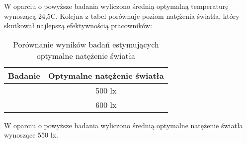 W oparciu o powyższe badania wyliczono średnią optymalną temperaturę wynoszącą 24,5\degree C.
Kolejna z tabel porównuje poziom natężenia światła, który skutkował najlepszą 
efektywnością pracowników:

\begin{table}[ht]
    \centering
    \caption{Porównanie wyników badań estymujących optymalne natężenie światła}
    \begin{tabular}{ |c|c| } 
     \hline
     Badanie & Optymalne natężenie światła \\ 
     \hline
     \parencite{chinchiuan2014} & 500 lx \\ 
     \hline
     \parencite{liu2017} & 600 lx \\ 
     \hline
    \end{tabular}
    \label{tab:optymalne-natezenie}
\end{table}

W oparciu o powyższe badania wyliczono średnią optymalne natężenie światła 
wynoszące 550 lx.